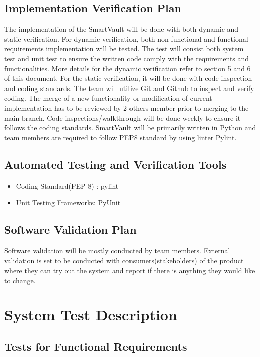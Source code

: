 \documentclass[12pt, titlepage]{article}
\begin{document}
\subsection{Implementation Verification Plan}

The implementation of the SmartVault will be done with both dynamic and static verification. For dynamic verification, both non-functional and functional requirements implementation will be tested. The test will consist both system test and unit test to ensure the written code comply with the requirements and functionalities. More details for the dynamic verification refer to section 5 and 6 of this document. For the static verification, it will be done with code inspection and coding standards. The team will utilize  Git and Github to inspect and verify coding. The merge of a new functionality or modification of current implementation has to be reviewed by 2 others member prior to merging to the main branch. Code inspections/walkthrough will be done weekly to ensure it follows the coding standards. SmartVault will be primarily written in Python and team members are required to follow PEP8 standard by using linter Pylint.
\subsection{Automated Testing and Verification Tools}

\begin{itemize}
    \item Coding Standard(PEP 8) : pylint
    \item Unit Testing Frameworks: PyUnit
   
   
\end{itemize}

\subsection{Software Validation Plan}

Software validation will be mostly conducted by team members. External validation is set to be conducted with consumers(stakeholders) of the product where they can try out the system and report if there is anything they would like to change.

\section{System Test Description}
	
\subsection{Tests for Functional Requirements}
\end{document}
